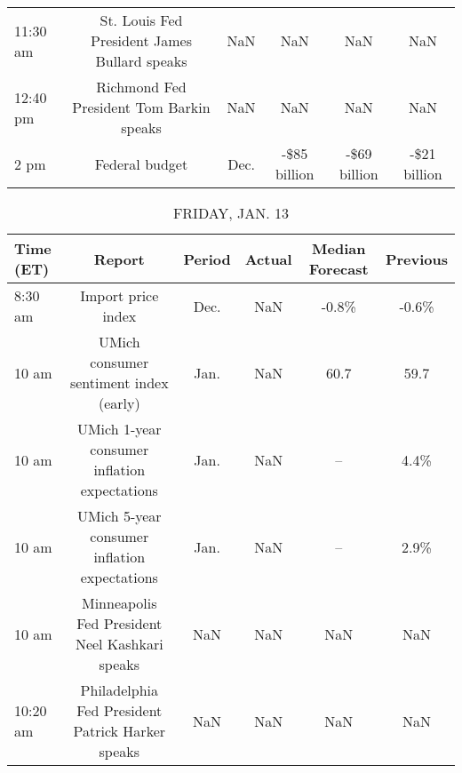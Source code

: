 \documentclass{article}%
\begin{document}
\begin{table}[htbp]
\begin{adjustbox}{width=1\textwidth}
\begin{tabular}{lccccc}
 11:30 am &     St. Louis Fed President James Bullard speaks &     NaN &          NaN &             NaN &          NaN \\
 12:40 pm &         Richmond Fed President Tom Barkin speaks &     NaN &          NaN &             NaN &          NaN \\
     2 pm &                                   Federal budget &    Dec. & -\$85 billion &    -\$69 billion & -\$21 billion \\
\bottomrule
\end{tabular}
%
\end{adjustbox}%
\end{table}

%


\begin{table}[htbp]%
\caption{FRIDAY, JAN. 13}%
\centering%
\begin{adjustbox}{width=1\textwidth}%
\begin{tabular}{lccccc}
\toprule
Time (ET) &                                           Report & Period & Actual & Median Forecast & Previous \\
\midrule
  8:30 am &                               Import price index &   Dec. &    NaN &           -0.8\% &    -0.6\% \\
    10 am &           UMich consumer sentiment index (early) &   Jan. &    NaN &            60.7 &     59.7 \\
    10 am &     UMich 1-year consumer inflation expectations &   Jan. &    NaN &              -- &     4.4\% \\
    10 am &     UMich 5-year consumer inflation expectations &   Jan. &    NaN &              -- &     2.9\% \\
    10 am &   Minneapolis Fed President Neel Kashkari speaks &    NaN &    NaN &             NaN &      NaN \\
 10:20 am & Philadelphia Fed President Patrick Harker speaks &    NaN &    NaN &             NaN &      NaN \\
\bottomrule
\end{tabular}
%
\end{adjustbox}%
\end{table}
\end{document}
